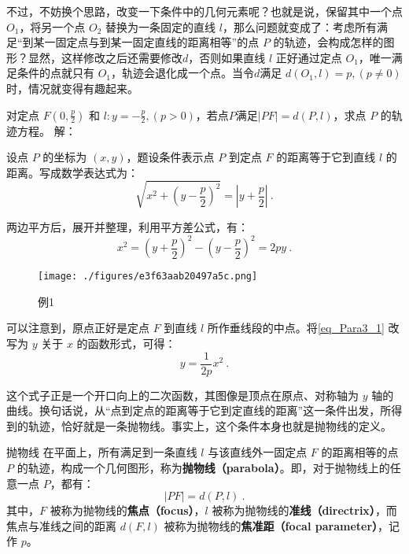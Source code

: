 不过，不妨换个思路，改变一下条件中的几何元素呢？也就是说，保留其中一个点 $O_1$，将另一个点 $O_2$ 替换为一条固定的直线 $l$，那么问题就变成了：考虑所有满足“到某一固定点与到某一固定直线的距离相等”的点 $P$ 的轨迹，会构成怎样的图形？显然，这样修改之后还需要修改$d$，否则如果直线 $l$ 正好通过定点 $O_1$，唯一满足条件的点就只有 $O_1$，轨迹会退化成一个点。当令$d$满足 $d(O_1,l)=p,(p\neq0)$时，情况就变得有趣起来。

\begin{example}{对定点 $F\left(0, \displaystyle\frac{p}{2}\right)$ 和 $l:y=-\displaystyle\frac{p}{2},\left(p>0\right)$，若点$P$满足$|PF|=d(P,l)$，求点 $P$ 的轨迹方程。}\label{ex_Para3_1}
解：

设点 $P$ 的坐标为 $(x, y)$，题设条件表示点 $P$ 到定点 $F$ 的距离等于它到直线 $l$ 的距离。写成数学表达式为：
\begin{equation}
\sqrt{x^2 + \left(y - \frac{p}{2}\right)^2} = |y + \frac{p}{2}|~.
\end{equation}

两边平方后，展开并整理，利用平方差公式，有：
\begin{equation}\label{eq_Para3_1}
x^2 = \left(y + \frac{p}{2}\right)^2 - \left(y - \frac{p}{2}\right)^2 = 2py~.
\end{equation}
\begin{figure}[ht]
\centering
\texttt{[image: ./figures/e3f63aab20497a5c.png]}
\caption{例1} \label{fig_Para3_4}
\end{figure}
\end{example}

可以注意到，原点正好是定点 $F$ 到直线 $l$ 所作垂线段的中点。将\autoref{eq_Para3_1} 改写为 $y$ 关于 $x$ 的函数形式，可得：
\begin{equation}\label{eq_Para3_2}
y = \frac{1}{2p}x^2~.
\end{equation}

这个式子正是一个开口向上的二次函数，其图像是顶点在原点、对称轴为 $y$ 轴的曲线。换句话说，从“点到定点的距离等于它到定直线的距离”这一条件出发，所得到的轨迹，恰好就是一条抛物线。事实上，这个条件本身也就是抛物线的定义。

\begin{definition}{抛物线}
在平面上，所有满足到一条直线 $l$ 与该直线外一固定点 $F$ 的距离相等的点 $P$ 的轨迹，构成一个几何图形，称为\textbf{抛物线（parabola）}。即，对于抛物线上的任意一点 $P$，都有：
\begin{equation}
|PF| = d(P, l)~.
\end{equation}
其中，$F$ 被称为抛物线的\textbf{焦点（focus）}，$l$ 被称为抛物线的\textbf{准线（directrix）}，而焦点与准线之间的距离 $d(F, l)$ 被称为抛物线的\textbf{焦准距（focal parameter）}，记作 $p$。
\end{definition}


